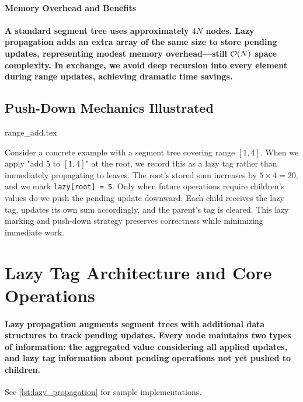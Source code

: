 \paragraph{Memory Overhead and Benefits}
\paragraph{A standard segment tree uses approximately $4N$ nodes. Lazy propagation adds an extra array of the same size to store pending updates, representing modest memory overhead—still $\mathcal{O}(N)$ space complexity. In exchange, we avoid deep recursion into every element during range updates, achieving dramatic time savings.}
\subsection{Push-Down Mechanics Illustrated}

\begin{algorithm}[H]
{range_add.tex}
\end{algorithm}
\vspace{1em}

Consider a concrete example with a segment tree covering range $[1,4]$. When we apply "add 5 to $[1,4]$" at the root, we record this as a lazy tag rather than immediately propagating to leaves. The root's stored sum increases by $5 \times 4 = 20$, and we mark \texttt{lazy[root] = 5}.
Only when future operations require children's values do we push the pending update downward. Each child receives the lazy tag, updates its own sum accordingly, and the parent's tag is cleared. This lazy marking and push-down strategy preserves correctness while minimizing immediate work.
\section{Lazy Tag Architecture and Core Operations}
\label{sec:lazy_tag_mechanics}
\paragraph{Lazy propagation augments segment trees with additional data structures to track pending updates. Every node maintains two types of information: the aggregated value considering all applied updates, and lazy tag information about pending operations not yet pushed to children.}
\begin{marginnoteenv}[0pt]
    See \ref{lst:lazy_propagation} for sample implementations.
\end{marginnoteenv}

